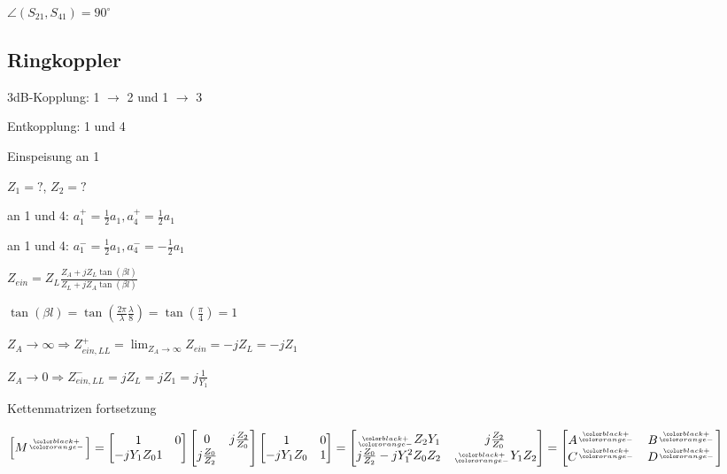 $\angle(S_{21}, S_{41}) = 90^\circ$

\subsection{Ringkoppler}

\fb


\begin{pitemize}
    \item 3dB-Kopplung: 1 $\rightarrow$ 2 und 1 $\rightarrow$ 3
    \item Entkopplung: 1 und 4
    \item Einspeisung an 1
    \item $Z_1 = ?$, $Z_2 = ?$ 
\end{pitemize}


\fb
\begin{pitemize}
    \item \cp  an 1 und 4: $a_1^+ = \frac{1}{2}a_1, a_4^+ = \frac{1}{2}a_1$
    \item \cm  an 1 und 4: $a_1^- = \frac{1}{2}a_1, a_4^- = -\frac{1}{2}a_1$
\end{pitemize}


\fb
\begin{pitemize}
    \item $Z_{ein} = Z_L \frac{Z_A + jZ_L \tan(\beta l)}{Z_L + jZ_A \tan(\beta l)}$
    \item $\tan(\beta l) = \tan(\frac{2\pi}{\lambda} \frac{\lambda}{8}) = \tan(\frac{\pi}{4}) = 1$
    \item \cp $Z_A \rightarrow \infty \Rightarrow Z_{ein,LL}^+ = \lim_{Z_A \rightarrow \infty}\limits Z_{ein} = -jZ_L = -jZ_1$
    \item \cm $Z_A \rightarrow 0 \Rightarrow Z_{ein,LL}^- = jZ_L = jZ_1 = j\frac{1}{Y_1}$
\end{pitemize}

Kettenmatrizen fortsetzung
\fb

$\left[M^\ggt{+}{-}\right] = \begin{bmatrix}
    1 & 0 \\ -jY_1Z_0 1
\end{bmatrix}\begin{bmatrix}
    0 & j\frac{Z_2}{Z_0} \\ j\frac{Z_0}{Z_2}
\end{bmatrix}\begin{bmatrix}
    1 & 0 \\ -jY_1Z_0 & 1
\end{bmatrix}
= \begin{bmatrix}
    \ggt{+}{-}Z_2Y_1 & j \frac{Z_2}{Z_0}\\ j\frac{Z_0}{Z_2} - jY_1^2Z_0Z_2 & \ggt{+}{-}Y_1Z_2
\end{bmatrix} = \begin{bmatrix}
    A^\ggt{+}{-} & B^\ggt{+}{-} \\ C^\ggt{+}{-} & D^\ggt{+}{-}
\end{bmatrix}$

